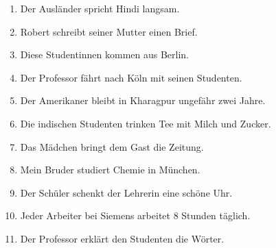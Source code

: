 \documentclass[12pt]{article}
\begin{document}
\begin{enumerate}
    \item Der Ausländer spricht Hindi langsam.
    \item Robert schreibt seiner Mutter einen Brief.
    \item Diese Studentinnen kommen aus Berlin.
    \item Der Professor fährt nach Köln mit seinen Studenten.
    \item Der Amerikaner bleibt in Kharagpur ungefähr zwei Jahre.
    \item Die indischen Studenten trinken Tee mit Milch und Zucker.
    \item Das Mädchen bringt dem Gast die Zeitung.
    \item Mein Bruder studiert Chemie in München.
    \item Der Schüler schenkt der Lehrerin eine schöne Uhr.
    \item Jeder Arbeiter bei Siemens arbeitet 8 Stunden täglich.
    \item Der Professor erklärt den Studenten die Wörter.
\end{enumerate}
\end{document}
